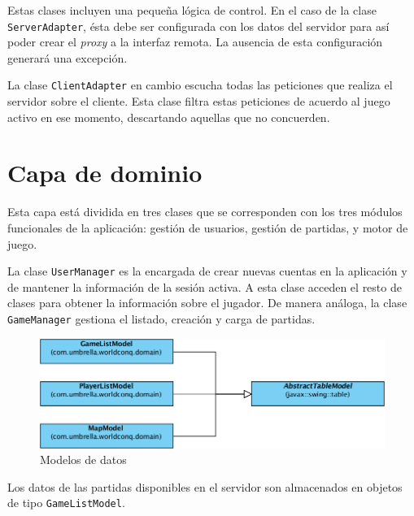 Estas clases incluyen una pequeña lógica de control. En el caso de la clase
\texttt{ServerAdapter}, ésta debe ser configurada con los datos del servidor
para así poder crear el \textit{proxy} a la interfaz remota. La ausencia de
esta configuración generará una excepción.

La clase \texttt{ClientAdapter} en cambio escucha todas las peticiones que
realiza el servidor sobre el cliente. Esta clase filtra estas peticiones de
acuerdo al juego activo en ese momento, descartando aquellas que no concuerden.

\section{Capa de dominio}

Esta capa está dividida en tres clases que se corresponden con los tres módulos
funcionales de la aplicación: gestión de usuarios, gestión de partidas, y motor
de juego.

La clase \texttt{UserManager} es la encargada de crear nuevas cuentas en la
aplicación y de mantener la información de la sesión activa. A esta clase
acceden el resto de clases para obtener la información sobre el jugador. De
manera análoga, la clase \texttt{GameManager} gestiona el listado, creación y
carga de partidas.

\begin{figure}[h]
\caption{Modelos de datos}
\centering
\includegraphics[scale=0.4]{img/ch02arch-models.png}
\end{figure}

Los datos de las partidas disponibles en el servidor son almacenados en objetos
de tipo \texttt{GameListModel}.

